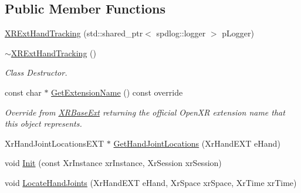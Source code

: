 \subsection*{Public Member Functions}
\begin{DoxyCompactItemize}
\item 
\mbox{\hyperlink{class_open_x_r_provider_1_1_x_r_ext_hand_tracking_ae93fec1405449c8a6f6027f82d869d44}{X\+R\+Ext\+Hand\+Tracking}} (std\+::shared\+\_\+ptr$<$ spdlog\+::logger $>$ p\+Logger)
\item 
\mbox{\hyperlink{class_open_x_r_provider_1_1_x_r_ext_hand_tracking_a3a23c2516160d65a98d3323d4bdb9959}{$\sim$\+X\+R\+Ext\+Hand\+Tracking}} ()
\begin{DoxyCompactList}\small\item\em Class Destructor. \end{DoxyCompactList}\item 
const char $\ast$ \mbox{\hyperlink{class_open_x_r_provider_1_1_x_r_ext_hand_tracking_a8706a0fc581e47e3b15fd6b58c9d5266}{Get\+Extension\+Name}} () const override
\begin{DoxyCompactList}\small\item\em Override from \mbox{\hyperlink{class_open_x_r_provider_1_1_x_r_base_ext}{X\+R\+Base\+Ext}} returning the official Open\+XR extension name that this object represents. \end{DoxyCompactList}\item 
Xr\+Hand\+Joint\+Locations\+E\+XT $\ast$ \mbox{\hyperlink{class_open_x_r_provider_1_1_x_r_ext_hand_tracking_aaa8a634f50dd27d3ef1b3c85b558a6c1}{Get\+Hand\+Joint\+Locations}} (Xr\+Hand\+E\+XT e\+Hand)
\item 
void \mbox{\hyperlink{class_open_x_r_provider_1_1_x_r_ext_hand_tracking_a6e48f57912a57ed5280dc3e939cc78c4}{Init}} (const Xr\+Instance xr\+Instance, Xr\+Session xr\+Session)
\item 
void \mbox{\hyperlink{class_open_x_r_provider_1_1_x_r_ext_hand_tracking_a1bc1b8d8b5dc0d10003c5f93a9f0c041}{Locate\+Hand\+Joints}} (Xr\+Hand\+E\+XT e\+Hand, Xr\+Space xr\+Space, Xr\+Time xr\+Time)
\end{DoxyCompactItemize}
